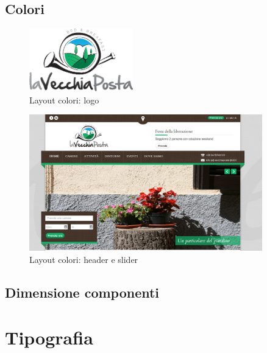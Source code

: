 \documentclass[a4paper,12pt,hidelinks]{report}
\begin{document}
\subsection*{Colori}

\begin{figure}[h!]%
    \includegraphics[width=0.4\textwidth,keepaspectratio=true]{../img/logo}
    \centering
    \caption{Layout colori: logo}%
    \label{fig:logo}%
\end{figure}


\begin{figure}[h!]%
    \includegraphics[width=0.9\textwidth,keepaspectratio=true]{../img/layoutHome}
    \centering
    \caption{Layout colori: header e slider}%
    \label{fig:header_slider}%
\end{figure}


\newpage
\subsection*{Dimensione componenti}


\section*{Tipografia}
\end{document}
